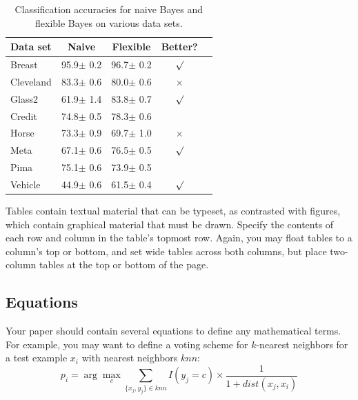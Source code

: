 \documentclass{article}
\begin{document}
\begin{table}[t]
\caption{Classification accuracies for naive Bayes and flexible
Bayes on various data sets.}
\label{sample-table}
\vskip 0.15in
\begin{center}
\begin{small}
\begin{sc}
\begin{tabular}{lcccr}
\hline
\abovespace\belowspace
Data set & Naive & Flexible & Better? \\
\hline
\abovespace
Breast    & 95.9$\pm$ 0.2& 96.7$\pm$ 0.2& $\surd$ \\
Cleveland & 83.3$\pm$ 0.6& 80.0$\pm$ 0.6& $\times$\\
Glass2    & 61.9$\pm$ 1.4& 83.8$\pm$ 0.7& $\surd$ \\
Credit    & 74.8$\pm$ 0.5& 78.3$\pm$ 0.6&         \\
Horse     & 73.3$\pm$ 0.9& 69.7$\pm$ 1.0& $\times$\\
Meta      & 67.1$\pm$ 0.6& 76.5$\pm$ 0.5& $\surd$ \\
Pima      & 75.1$\pm$ 0.6& 73.9$\pm$ 0.5&         \\
\belowspace
Vehicle   & 44.9$\pm$ 0.6& 61.5$\pm$ 0.4& $\surd$ \\
\hline
\end{tabular}
\end{sc}
\end{small}
\end{center}
\vskip -0.1in
\end{table}

Tables contain textual material that can be typeset, as contrasted
with figures, which contain graphical material that must be drawn.
Specify the contents of each row and column in the table's topmost
row. Again, you may float tables to a column's top or bottom, and set
wide tables across both columns, but place two-column tables at the
top or bottom of the page.
\subsection{Equations}
Your paper should contain several equations to define any mathematical terms.
For example, you may want to define a voting scheme for $k$-nearest neighbors
for a test example $x_i$ with nearest neighbors $knn$:
\begin{equation}
  p_i = \arg\max_c \sum_{\{x_j,y_j\} \in knn} I(y_j = c) \times \frac{1}{1+dist(x_j, x_i)}
\end{equation}\label{eqn:vote}
\end{document}
